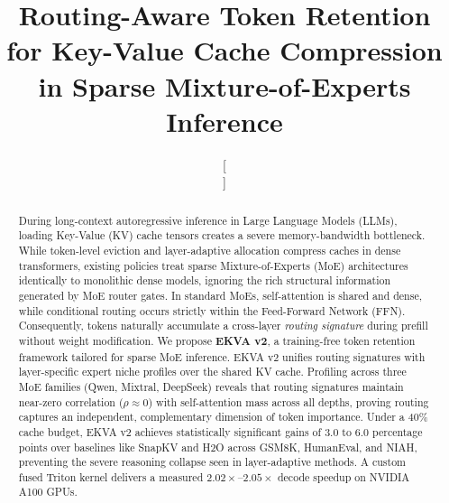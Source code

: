 \documentclass[conference]{IEEEtran}
\begin{document}
\title{Routing-Aware Token Retention for Key-Value Cache Compression in Sparse Mixture-of-Experts Inference}

\author{
\and
{}
\and[\hfill\mbox{}\par\vspace{3mm}\mbox{}\hfill]
\and
{}
}

\maketitle

\begin{abstract}
During long-context autoregressive inference in Large Language Models (LLMs), loading Key-Value (KV) cache tensors creates a severe memory-bandwidth bottleneck. While token-level eviction and layer-adaptive allocation compress caches in dense transformers, existing policies treat sparse Mixture-of-Experts (MoE) architectures identically to monolithic dense models, ignoring the rich structural information generated by MoE router gates. In standard MoEs, self-attention is shared and dense, while conditional routing occurs strictly within the Feed-Forward Network (FFN). Consequently, tokens naturally accumulate a cross-layer \emph{routing signature} during prefill without weight modification. We propose \textbf{EKVA v2}, a training-free token retention framework tailored for sparse MoE inference. EKVA v2 unifies routing signatures with layer-specific expert niche profiles over the shared KV cache. Profiling across three MoE families (Qwen, Mixtral, DeepSeek) reveals that routing signatures maintain near-zero correlation ($\rho \approx 0$) with self-attention mass across all depths, proving routing captures an independent, complementary dimension of token importance. Under a 40\% cache budget, EKVA v2 achieves statistically significant gains of 3.0 to 6.0 percentage points over baselines like SnapKV and H2O across GSM8K, HumanEval, and NIAH, preventing the severe reasoning collapse seen in layer-adaptive methods. A custom fused Triton kernel delivers a measured $2.02\times$--$2.05\times$ decode speedup on NVIDIA A100 GPUs.
\end{abstract}
\end{document}

